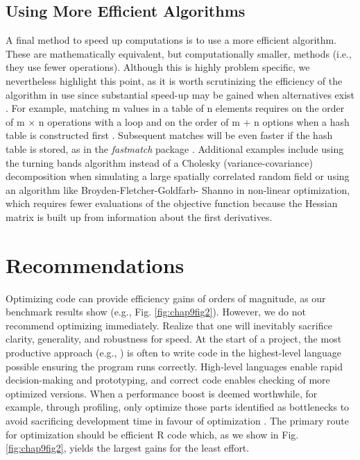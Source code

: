 \documentclass[b5paper,justified]{tufte-book} %
\begin{document}
\begin{fullwidth}
\subsection{Using More Efficient Algorithms}
A final method to speed up computations is to use a more efficient algorithm. These are mathematically equivalent, but computationally smaller, methods (i.e., they use fewer operations). Although this is highly problem specific, we nevertheless highlight this point, as it is worth scrutinizing the efficiency of the algorithm in use since substantial speed-up may be gained when alternatives exist \citep{Petrovskii2012}. For example, matching m values in a table of n elements requires on the order of m $\times$ n operations with a loop and on the order of m + n options when a hash table is constructed first \citep{Chambers2009}. Subsequent matches will be even faster if the hash table is stored, as in the \textit{fastmatch} package \citep{Urbanek2012}.  Additional examples include using the turning bands algorithm \citep{Finley2011, Mantoglou1982} instead of a Cholesky (variance-covariance) decomposition when simulating a large spatially correlated random field or using an algorithm like Broyden-Fletcher-Goldfarb-
Shanno in non-linear optimization, which requires fewer evaluations of the objective function because the Hessian matrix is built up from information about the first derivatives.

\section{Recommendations}
Optimizing code can provide efficiency gains of orders of magnitude, as our benchmark results show (e.g., Fig. \ref{fig:chap9fig2}). However, we do not recommend optimizing immediately. Realize that one will inevitably sacrifice clarity, generality, and robustness for speed. At the start of a project, the most productive approach (e.g., \citealt{Wilson2012}) is often to write code in the highest-level language possible ensuring the program runs correctly. High-level languages enable rapid decision-making and prototyping, and correct code enables checking of more optimized versions. When a performance boost is deemed worthwhile, for example, through profiling, only optimize those parts identified as bottlenecks to avoid sacrificing development time in favour of optimization
\citep{Chambers2009, Wilson2012}. The primary route for optimization should be efficient R code which, as we show in
Fig. \ref{fig:chap9fig2}, yields the largest gains for the least effort.


\end{fullwidth}
\end{document}
